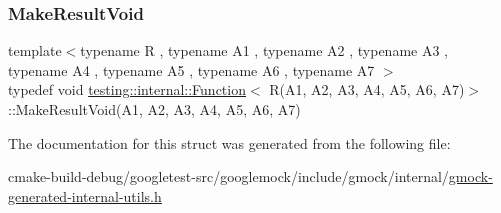\subsubsection{\texorpdfstring{MakeResultVoid}{MakeResultVoid}}
{\footnotesize\ttfamily template$<$typename R , typename A1 , typename A2 , typename A3 , typename A4 , typename A5 , typename A6 , typename A7 $>$ \\
typedef void \mbox{\hyperlink{structtesting_1_1internal_1_1Function}{testing\+::internal\+::\+Function}}$<$ R(A1, A2, A3, A4, A5, A6, A7)$>$\+::Make\+Result\+Void(A1, A2, A3, A4, A5, A6, A7)}



The documentation for this struct was generated from the following file\+:\begin{DoxyCompactItemize}
\item 
cmake-\/build-\/debug/googletest-\/src/googlemock/include/gmock/internal/\mbox{\hyperlink{gmock-generated-internal-utils_8h}{gmock-\/generated-\/internal-\/utils.\+h}}\end{DoxyCompactItemize}
